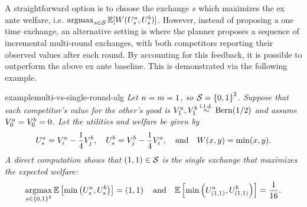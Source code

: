 A straightforward option is to choose the exchange $s$ which maximizes the ex ante welfare, i.e.
$\operatorname*{argmax}_{
        s\in\mathcal{S}
    }
    \mathbb{E}[W(U^a_{s},U^b_{s})      
    ] $.
However, instead of proposing a one time exchange, an alternative setting is where the planner proposes a sequence of incremental multi-round exchanges, with both competitors reporting their observed values after each round.
By accounting for this feedback, it is possible to outperform the above ex ante baseline. This is demonstrated via the following example.


\begin{restatable}{example}{multi-vs-single-round-alg}
    \label{ex:multi-vs-single-round-alg}
    \emph{
    Let $n=m=1$, so $\mathcal{S}=\left\{0,1\right\}^2$. Suppose that each competitor's value for the other's good is 
$V^a_{1},V^b_{1}\overset{\text{i.i.d.}}{\sim}\textup{Bern}(1/2)$ and assume $V^a_{0}=V^b_{0}=0$.
    Let the utilities and welfare be given by
    \begin{align*}
        U^a_{s}
        =
        V^a_{i}-\frac{1}{4}V^b_{j},
        \quad 
        U^b_{s}
        =
        V^b_{j}-\frac{1}{4}V^a_{i},
        \quad
        \text{and}
        \quad
        W(x,y)=\min(x,y) .
    \end{align*}  
    A direct computation shows that 
    $(1,1)\in\mathcal{S}$ is the single exchange that maximizes the expected welfare:
    \begin{align*}
        \operatorname*{argmax}_{
            s\in\left\{0,1\right\}^2
        }
        \mathbb{E}\left[
            \min\left(
                U^a_{s},U^b_{s}
            \right)
        \right] =
                \left(1,1\right) 
        \quad
        \text{and}
        \quad
        \mathbb{E}\left[
            \min\left(
                U^a_{(1,1)},U^b_{(1,1)}
            \right)
        \right] 
        =
        \frac{1}{16} .
    \end{align*}  
    }


\end{restatable}
